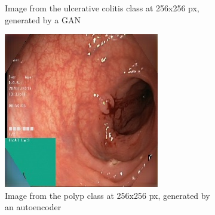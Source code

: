 \begin{figure}[t]
\begin{subfigure}[b]{0.4\textwidth}
            \caption[Hate to be this guy]%
            {{\small Image from the ulcerative colitis class at 256x256 px, generated by a GAN}}    
            \label{fig:polypGANBLACK}
        \end{subfigure}
        \qquad\vfill%
        \begin{subfigure}[b]{0.4\textwidth}   
            \centering 
            \includegraphics[width=\textwidth]{experiments/figures/blackcorner/polypwithgreenAE.jpg}
            \caption[]%
            {{\small Image from the polyp class at 256x256 px, generated by an autoencoder }}    
            \label{fig:zAEBLACK}
        \end{subfigure}
        \qquad%
        \begin{subfigure}[b]{0.4\textwidth}   
            \centering 

\end{subfigure}
\end{figure}
